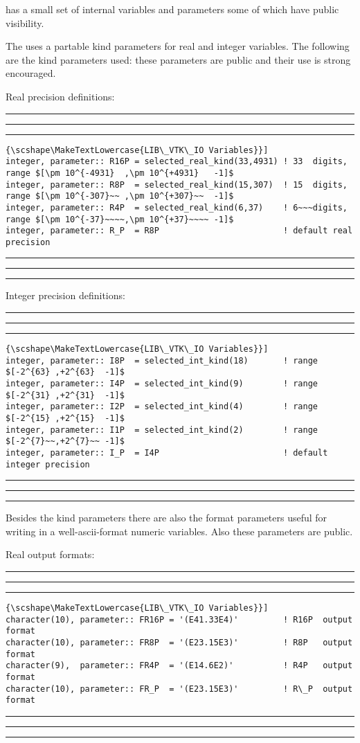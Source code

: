 \documentclass[pagesize=pdftex,fontsize=10pt,paper=a4,oneside]{scrbook}
\DeclareRobustCommand{\MarginNote}[1]{\marginpar{%
\slshape\footnotesize%
\parindent=0pt\lineskip=0pt\lineskiplimit=0pt%
\tolerance=2000\hyphenpenalty=300\exhyphenpenalty=300%
\doublehyphendemerits=100000\finalhyphendemerits=\doublehyphendemerits%
\raggedright\hspace{0pt}#1}}
\newenvironment{boxred}[1]%
               {%
                \noindent\hspace*{-0.025\textwidth}%
                \color{Maroon}%
                \rule[-5.8pt]{0.6pt}{6pt}\hspace*{-0.6pt}\rule{1.05\textwidth}{0.6pt}\hspace*{-0.6pt}\rule[-5.8pt]{0.6pt}{6pt}%
                \color{black}%
                \vspace*{0.6pt}\MarginNote{\color{Maroon}{#1}}%
               }%
               {%
                \noindent\hspace*{-0.025\textwidth}%
                \color{Maroon}%
                \rule[0pt]{0.6pt}{6pt}\hspace*{-0.6pt}\rule{1.05\textwidth}{0.6pt}\hspace*{-0.6pt}\rule[0pt]{0.6pt}{6pt}%
                \color{black}%
                \vspace*{2mm}%
               }
\DeclareRobustCommand{\MaiuscolettoBS}[1]{\textls[80]{\scshape\MakeTextLowercase{#1}}}
\begin{document}
\LIBVTKIO has a small set of internal variables and parameters some of which have public visibility.

The \LIBVTKIO uses a partable kind parameters for real and integer variables. The following are the kind parameters used: these
parameters are public and their use is strong encouraged.

Real precision definitions:

 
\begin{boxred}{}
\begin{lstlisting}[style=variables,title=\color{Maroon}\MaiuscolettoBS{LIB\_VTK\_IO Variables}]
integer, parameter:: R16P = selected_real_kind(33,4931) ! 33  digits, range $[\pm 10^{-4931}  ,\pm 10^{+4931}   -1]$
integer, parameter:: R8P  = selected_real_kind(15,307)  ! 15  digits, range $[\pm 10^{-307}~~ ,\pm 10^{+307}~~  -1]$
integer, parameter:: R4P  = selected_real_kind(6,37)    ! 6~~~digits, range $[\pm 10^{-37}~~~~,\pm 10^{+37}~~~~ -1]$
integer, parameter:: R_P  = R8P                         ! default real precision
\end{lstlisting}

\end{boxred}
 
Integer precision definitions:

 
\begin{boxred}{}
\begin{lstlisting}[style=variables,title=\color{Maroon}\MaiuscolettoBS{LIB\_VTK\_IO Variables}]
integer, parameter:: I8P  = selected_int_kind(18)       ! range $[-2^{63} ,+2^{63}  -1]$
integer, parameter:: I4P  = selected_int_kind(9)        ! range $[-2^{31} ,+2^{31}  -1]$
integer, parameter:: I2P  = selected_int_kind(4)        ! range $[-2^{15} ,+2^{15}  -1]$
integer, parameter:: I1P  = selected_int_kind(2)        ! range $[-2^{7}~~,+2^{7}~~ -1]$
integer, parameter:: I_P  = I4P                         ! default integer precision
\end{lstlisting}

\end{boxred}
 

Besides the kind parameters there are also the format parameters useful for writing in a well-ascii-format numeric variables.
Also these parameters are public.

 Real output formats:

 
\begin{boxred}{}
\begin{lstlisting}[style=variables,title=\color{Maroon}\MaiuscolettoBS{LIB\_VTK\_IO Variables}]
character(10), parameter:: FR16P = '(E41.33E4)'         ! R16P  output format
character(10), parameter:: FR8P  = '(E23.15E3)'         ! R8P   output format
character(9),  parameter:: FR4P  = '(E14.6E2)'          ! R4P   output format
character(10), parameter:: FR_P  = '(E23.15E3)'         ! R\_P  output format
\end{lstlisting}

\end{boxred}
 
\end{document}

